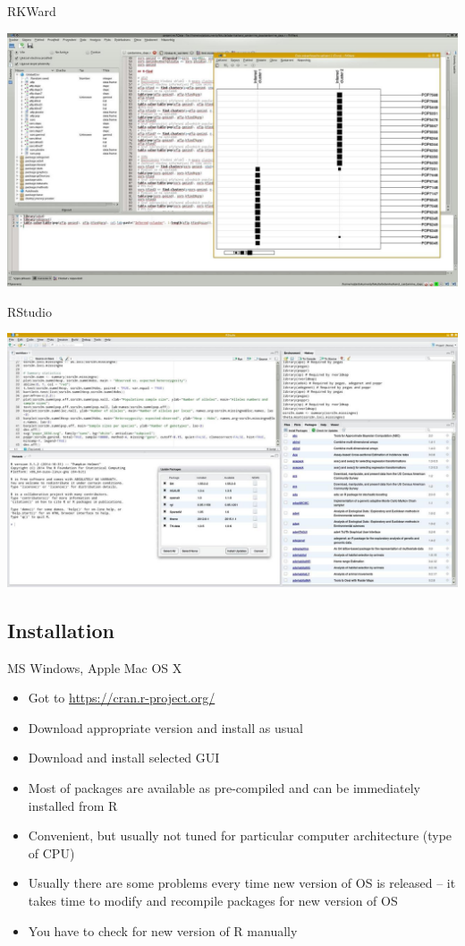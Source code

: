 \documentclass[compress, ucs, xelatex, 11pt, xcolor=svgnames,
  hyperref={
    bookmarks=true,
    unicode=true,
    colorlinks=true,
    pdftitle={Molecular data in R},
    plainpages=false,
    pdfauthor={Vojtech Zeisek},
    pdfsubject={Course about phylogeny and evolution in R},
    pdfcreator={XeLaTeX},
    pdfkeywords={R, evolution, phylogeny, molecular data},
    linkcolor=Tomato,
    anchorcolor=SaddleBrown,
    citecolor=Goldenrod,
    filecolor=DarkMagenta,
    menucolor=Sienna,
    urlcolor=DarkTurquoise,
    pdftex},
  url={hyphens, lowtilde} %
  ]{beamer}
\begin{document}
\begin{frame}{RKWard}
\begin{center}
  \includegraphics[width=\textwidth]{rkward.jpg}
\end{center}
\end{frame}

\begin{frame}{RStudio}
\begin{center}
  \includegraphics[width=\textwidth]{rstudio.jpg}
\end{center}
\end{frame}

\subsection{Installation}

\begin{frame}{MS Windows, Apple Mac OS X}
\begin{itemize}
 \item Got to \url{https://cran.r-project.org/}
 \item Download appropriate version and install as usual
 \item Download and install selected GUI
 \item Most of packages are available as pre-compiled and can be immediately installed from R
 \item Convenient, but usually not tuned for particular computer architecture (type of CPU)
 \item Usually there are some problems every time new version of OS is released -- it takes time to modify and recompile packages for new version of OS
 \item You have to check for new version of R manually
\end{itemize}
\end{frame}
\end{document}
